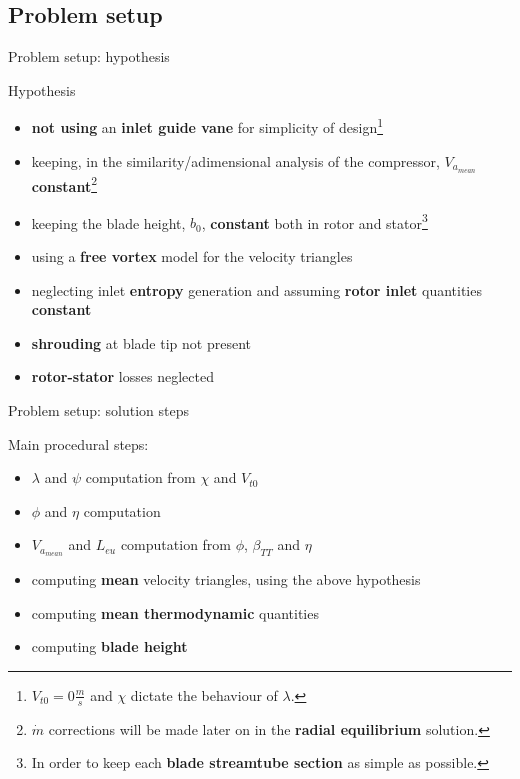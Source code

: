 \subsection{Problem setup}
	{\nologo
	\begin{frame}{Problem setup: hypothesis}
	\begin{alertblock}{Hypothesis}
		\begin{itemize}
			\item \textbf{not using} an \textbf{inlet guide vane} for simplicity of design\footnote{$V_{t0} = 0 \frac{m}{s}$ and $\chi$ dictate the behaviour of $\lambda$.}
			\item keeping, in the similarity/adimensional analysis of the compressor, $V_{a_{mean}}$ \textbf{constant}\footnote{$\dot{m}$ corrections will be made later on in the \textbf{radial equilibrium} solution.}  
			\item keeping the blade height, $b_0$, \textbf{constant} both in rotor and stator\footnote{In order to keep each \textbf{blade streamtube section} as simple as possible.}
			\item using a \textbf{free vortex} model for the velocity triangles
			\item neglecting inlet \textbf{entropy} generation and assuming \textbf{rotor inlet} quantities \textbf{constant}
			\item \textbf{shrouding} at blade tip not present
			\item \textbf{rotor-stator} losses neglected
		\end{itemize}
	\end{alertblock}
	\end{frame}
	}
		\begin{frame}{Problem setup: solution steps}
		\begin{block}{Main procedural steps:}
			\begin{itemize}
				\item $\lambda$ and $\psi$ computation from $\chi$ and $V_{t0}$
				\item $\phi$ and $\eta$ computation 
				\item $V_{a_{mean}}$ and $L_{eu}$ computation from $\phi$, $\beta_{TT}$ and $\eta$
				\item computing \textbf{mean} velocity triangles, using the above hypothesis
				\item computing \textbf{mean thermodynamic} quantities 
				\item computing \textbf{blade height}
			\end{itemize}
		\end{block}
	\end{frame}
